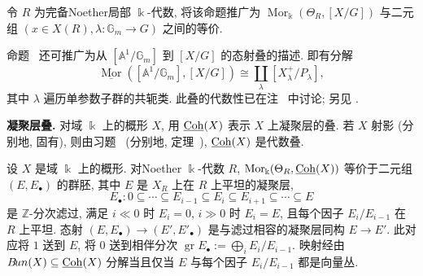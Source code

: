 \begin{exercise}[细节]\label{src:7.9.4}
令 $R$ 为完备Noether局部 $\Bbbk$-代数, 将该命题推广为 $\operatorname{Mor}_{\Bbbk}(\Theta_R,[X/G])$ 与二元组 $(x\in X(R),\lambda:\mathbb G_m\to G)$ 之间的等价.
\end{exercise}
\begin{remark}\label{src:7.9.5}
命题~ 还可推广为从 $[\mathbb A^1/\mathbb G_m]$ 到 $[X/G]$ 的态射叠的描述. 即有分解
\[\underline{\operatorname{Mor}}([\mathbb A^1/\mathbb G_m],[X/G])\cong\coprod_\lambda[X_\lambda^+/P_\lambda],\]
其中 $\lambda$ 遍历单参数子群的共轭类. 此叠的代数性已在注~ 中讨论; 另见 \cite[定理~1.37]{HL14}.
\end{remark}
\textbf{凝聚层叠.} 对域 $\Bbbk$ 上的概形 $X$, 用 $\underline{\mathrm{Coh}}(X)$ 表示 $X$ 上凝聚层的叠. 若 $X$ 射影 (分别地, 固有), 则由习题~ (分别地, 定理~), $\underline{\mathrm{Coh}}(X)$ 是代数叠.
\begin{proposition}\label{src:7.9.6}
设 $X$ 是域 $\Bbbk$ 上的概形. 对Noether $\Bbbk$-代数 $R$, $\operatorname{Mor}_{\Bbbk}(\Theta_R,\underline{\mathrm{Coh}}(X))$ 等价于二元组 $(E,E_\bullet)$ 的群胚, 其中 $E$ 是 $X_R$ 上在 $R$ 上平坦的凝聚层,
\[E_\bullet:0\subseteq\cdots\subseteq E_{i-1}\subseteq E_i\subseteq E_{i+1}\subseteq\cdots\subseteq E\]
是 $\mathbb Z$-分次滤过, 满足 $i\ll0$ 时 $E_i=0$, $i\gg0$ 时 $E_i=E$, 且每个因子 $E_i/E_{i-1}$ 在 $R$ 上平坦. 态射 $(E,E_\bullet)\to(E',E'_\bullet)$ 是与滤过相容的凝聚层同构 $E\to E'$. 此对应将 $1$ 送到 $E$, 将 $0$ 送到相伴分次 $\operatorname{gr}E_\bullet:=\bigoplus_iE_i/E_{i-1}$. 映射经由 $B\!un(X)\subseteq\underline{\mathrm{Coh}}(X)$ 分解当且仅当 $E$ 与每个因子 $E_i/E_{i-1}$ 都是向量丛.
\end{proposition}
